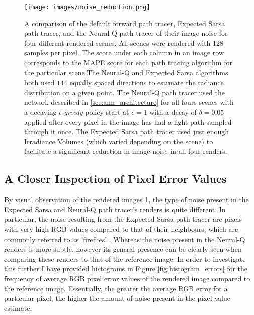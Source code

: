 \documentclass[../dissertation.tex]{subfiles}
\begin{document}
\begin{figure}[hbtp]
\begin{center}
\texttt{[image: images/noise\_reduction.png]}    
\end{center}
\caption{A comparison of the default forward path tracer, Expected Sarsa path tracer, and the Neural-Q path tracer of their image noise for four different rendered scenes. All scenes were rendered with 128 samples per pixel. The score under each column in an image row corresponds to the MAPE score for each  path tracing algorithm for the particular scene.The Neural-Q and Expected Sarsa algorithms both used $144$ equally spaced directions to estimate the radiance distribution on a given point. The Neural-Q path tracer used the network described in \ref{sec:ann_architecture} for all fours scenes with a decaying $\epsilon$-\textit{greedy} policy start at $\epsilon =1$ with a decay of $\delta = 0.05$ applied after every pixel in the image has had a light path sampled through it once. The Expected Sarsa path tracer used just enough Irradiance Volumes (which varied depending on the scene) to facilitate a significant reduction in image noise in all four renders.}
\label{fig:mape_results_grid}
\end{figure}

\subsection{A Closer Inspection of Pixel Error Values}

By visual observation of the rendered images \ref{fig:mape_results_grid}, the type of noise present in the Expected Sarsa and Neural-Q path tracer's renders is quite different. In particular, the noise resulting from the Expected Sarsa path tracer are pixels with very high RGB values compared to that of their neighbours, which are commonly referred to as 'fireflies'  \cite{christensen2016path}. Whereas the noise present in the Neural-Q renders is more subtle, however its general presence can be clearly seen when comparing these renders to that of the reference image. In order to investigate this further I have provided histograms in Figure \ref{fig:histogram_errors} for the frequency of average RGB pixel error values of the rendered image compared to the reference image. Essentially, the greater the average RGB error for a particular pixel, the higher the amount of noise present in the pixel value estimate.
\end{document}
